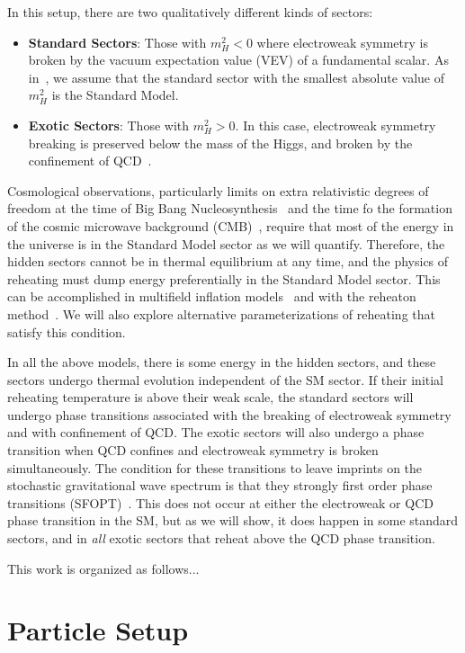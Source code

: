 \documentclass[nofootinbib,twocolumn,preprintnumbers]{revtex4-1}
\begin{document}
In this setup, there are two qualitatively different kinds of sectors:
\begin{itemize}
\item \textbf{Standard Sectors}: Those with $m_H^2 < 0$ where electroweak symmetry is broken by the vacuum expectation value (VEV) of a fundamental scalar. As in~\cite{Arkani-Hamed:2016rle}, we assume that the standard sector with the smallest absolute value of $m_H^2$ is the Standard Model.
\item \textbf{Exotic Sectors}: Those with  $m_H^2 > 0$. In this case, electroweak symmetry breaking is preserved below the mass of the Higgs, and broken by the confinement of QCD~\cite{}.
\end{itemize}
Cosmological observations, particularly limits on extra relativistic degrees of freedom at the time of Big Bang Nucleosynthesis~\cite{} and the time fo the formation of the cosmic microwave background (CMB)~\cite{}, require that most of the energy in the universe is in the Standard Model sector as we will quantify. Therefore, the hidden sectors cannot be in thermal equilibrium at any time, and the physics of reheating must dump energy preferentially in the Standard Model sector. This can be accomplished in multifield inflation models~\cite{} and with the reheaton method~\cite{Arkani-Hamed:2016rle}. We will also explore alternative parameterizations of reheating that satisfy this condition.

In all the above models, there is some energy in the hidden sectors, and these sectors undergo thermal evolution independent of the SM sector. If their initial reheating temperature is above their weak scale, the standard sectors will undergo phase transitions associated with the breaking of electroweak symmetry and with confinement of QCD. The exotic sectors will also undergo a phase transition when QCD confines and electroweak symmetry is broken simultaneously. The condition for these transitions to leave imprints on the stochastic gravitational wave spectrum is that they strongly first order phase transitions (SFOPT)~\cite{}. This does not occur at either the electroweak or QCD phase transition in the SM, but as we will show, it does happen in some standard sectors, and in \textit{all} exotic sectors that reheat above the QCD phase transition. 



This work is organized as follows...



 
\section{Particle Setup}
\label{sec:nn}
\end{document}

